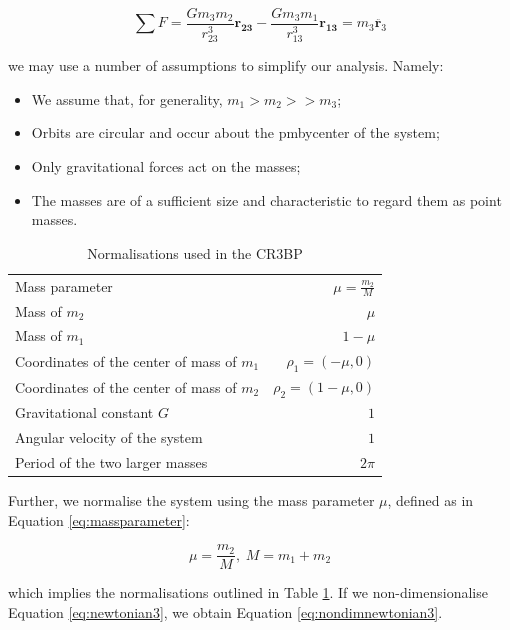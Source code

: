 \begin{equation}\label{eq:newtonian3}
\sum F = \frac{Gm_3m_2}{r^3_{23}}\pmb{r_{23}} - \frac{Gm_3m_1}{r^3_{13}} \pmb{r_{13}} = m_3 \ddot{\pmb{r}_3}
\end{equation}

\noindent we may use a number of assumptions to simplify our analysis. Namely:

\begin{itemize}
\item We assume that, for generality, $m_1 > m_2 >> m_3$;
\item Orbits are circular and occur about the pmbycenter of the system;
\item Only gravitational forces act on the masses;
\item The masses are of a sufficient size and characteristic to regard them as point masses.
\end{itemize}


\begin{table}[t]\label{tbl:normalisations}
\centering
\begin{tabular}{l r}
\toprule
\toprule
Mass parameter & $\mu = \frac{m_2}{M}$ \\
Mass of $m_2$ & $\mu$\\
Mass of $m_1$ & $1 - \mu$\\
Coordinates of the center of mass of $m_1$ & $\rho_1 = (-\mu, 0)$\\
Coordinates of the center of mass of $m_2$ & $\rho_2 = (1-\mu, 0)$\\
Gravitational constant $G$ &  $1$\\
Angular velocity of the system & $1$\\
Period of the two larger masses & $2\pi$\\
\bottomrule
\bottomrule
\end{tabular}
\caption{Normalisations used in the CR3BP}
\end{table}

\noindent Further, we normalise the system using the mass parameter $\mu$, defined as in Equation \ref{eq:massparameter}:

\begin{equation}\label{eq:massparameter}
\mu = \frac{m_2}{M}, \hspace{3pt} M = m_1 + m_2
\end{equation}

\noindent which implies the normalisations outlined in Table \ref{tbl:normalisations}. If we non-dimensionalise Equation \ref{eq:newtonian3}, we obtain Equation \ref{eq:nondimnewtonian3}.

